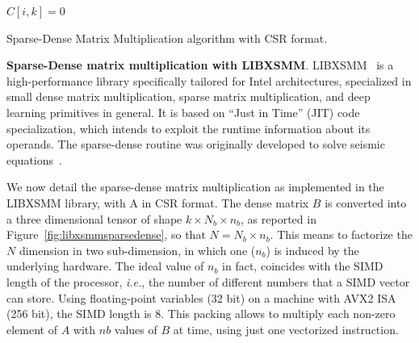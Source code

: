 \begin{algorithm}[]
	$C[i,k] = 0$\;

	\caption{Sparse-Dense Matrix Multiplication algorithm with CSR format.}
	\label{alg:csr_mult}
\end{algorithm}


\smallskip
\noindent \textbf{Sparse-Dense matrix multiplication with LIBXSMM}. LIBXSMM~\cite{heinecke2016libxsmm} is a high-performance library specifically tailored for Intel architectures, specialized in small dense matrix multiplication, sparse matrix multiplication, and deep learning primitives in general. It is based on ``Just in Time'' (JIT) code specialization, which intends to exploit the runtime information about its operands. The sparse-dense routine was originally developed to solve seismic equations~\cite{breuer2019petaflop}.

We now detail the sparse-dense matrix multiplication as implemented in the LIBXSMM library, with A in CSR format. 
The dense matrix $B$ is converted into a three dimensional tensor of shape $k \times N_b \times n_b$, as reported in Figure~\ref{fig:libxsmmsparsedense},
so that $N = N_b \times  n_b$. This means to factorize the $N$ dimension in two sub-dimension, in which one ($n_b$) is induced by the underlying hardware. The ideal value of $n_b$ in fact, coincides with the SIMD length of the processor, \textit{i.e.}, the number of different numbers that a SIMD vector can store. 
Using floating-point variables (32 bit) on a machine with AVX2 ISA (256 bit), the SIMD length is 8. This packing allows to  multiply each non-zero element of $A$  with $nb$ values of $B$ at time, using just one vectorized instruction.




